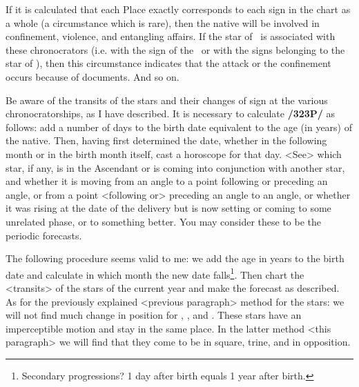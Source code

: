 If it is calculated that each Place exactly corresponds to each sign in the chart as a whole (a circumstance which is rare), then the native will be involved in confinement, violence, and entangling affairs. If the star of \Mercury\, is associated with these chronocrators (i.e. with the sign of the \Sun\, or with the signs belonging to the star of \Mars), then this circumstance indicates that the attack or the confinement
occurs because of documents. And so on.

Be aware of the transits of the stars and their changes of sign at the various chronocratorships, as I have described. It is necessary to calculate \textbf{/323P/} as follows: add a number of days to the birth date equivalent to the age (in years) of the native. Then, having first determined the date, whether in the following month or in the birth month itself, cast a horoscope for that day. <See> which star, if any, is in the Ascendant or is coming into conjunction with another star, and whether it is moving from an angle to a point following
or preceding an angle, or from a point <following or> preceding an angle to an angle, or whether it was rising at the date of the delivery but is now setting or coming to some unrelated phase, or to something better. You may consider these to be the periodic forecasts.

The following procedure seems valid to me: we add the age in years to the birth date and calculate in which month the new date falls\footnote{Secondary progressions? 1 day after birth equals 1 year after birth.}. Then chart the <transits> of the stars of the current year and make the forecast as described. As for the previously explained <previous paragraph> method for the stars: we will not find much change in position for \Saturn, \Jupiter, and \Mars. These stars have an imperceptible motion and stay in the same place. In the latter method <this paragraph> we will find that they come to be in square, trine, and in opposition.

\newpage
